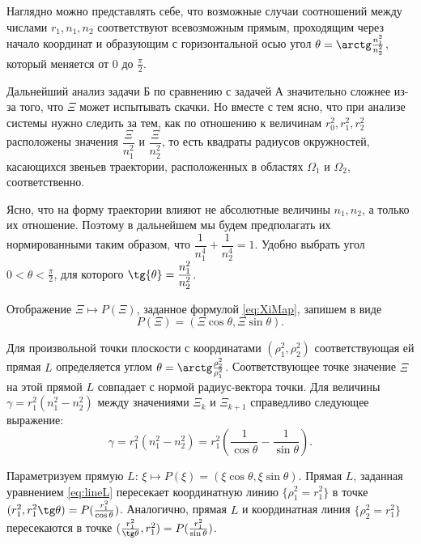Наглядно можно представлять себе, что возможные случаи соотношений между числами $r_1, n_1, n_2$ соответствуют всевозможным прямым, проходящим через начало координат и образующим   с горизонтальной осью угол $\theta = \arctg \frac{n_1^2}{n_2^2}$, который меняется от $0$ до $\frac{\pi}{2}$.

Дальнейший анализ задачи Б по сравнению с задачей А значительно сложнее из-за того, что $\Xi$ может испытывать скачки.
Но вместе с тем ясно, что при анализе системы нужно следить за тем, как по отношению к величинам $r_0^2, r_1^2, r_2^2$ расположены значения $\dfrac{\Xi}{n_1^2}$ и $\dfrac{\Xi}{n_2^2}$, то есть квадраты радиусов окружностей, касающихся звеньев траектории, расположенных в областях $\Omega_1$ и $\Omega_2$, соответственно.
\begin{remark}
Ясно, что на форму траектории влияют не абсолютные величины $n_1, n_2$, а только их отношение. Поэтому в дальнейшем мы будем предполагать их нормированными таким образом, что $\dfrac{1}{n_1^4} + \dfrac{1}{n_2^4} = 1$.
Удобно выбрать угол $0 < \theta < \frac{\pi}{2}$, для которого $\tg{\theta} = \dfrac{n_1^2}{n_2^2}$.
\end{remark}

Отображение $\Xi \mapsto P(\Xi)$, заданное формулой \eqref{eq:XiMap}, запишем в виде 
$$P(\Xi) = \left( \Xi \cos \theta, \Xi \sin \theta \right).$$

\begin{remark}
Для произвольной точки плоскости с координатами $(\rho_1^2, \rho_2^2)$ соответствующая ей прямая $L$ определяется углом $\theta = \arctg \frac{\rho_2^2}{\rho_1^2}$. Соответствующее точке значение $\Xi$ на этой прямой $L$ совпадает с нормой радиус-вектора точки.
Для величины $\gamma = r_1^2 (n_1^2 - n_2^2)$ между значениями $\Xi_k$ и $\Xi_{k+1}$  справедливо следующее выражение:
$$\gamma = r_1^2 (n_1^2 - n_2^2) = r_1^2 \left( \frac{1}{\cos \theta} -  \frac{1}{\sin \theta} \right).$$

\end{remark}

Параметризуем прямую $L$: $\xi \mapsto P(\xi) = (\xi \cos \theta, \xi \sin \theta)$.
Прямая $L$, заданная уравнением \eqref{eq:lineL} пересекает координатную линию $\{ \rho_1^2 = r_1^2 \}$ в точке $(r_1^2, r_1^2 \tg \theta) = P(\frac{r_1^2}{\cos \theta})$.
Аналогично, прямая $L$ и координатная линия $\{ \rho_2^2 = r_1^2 \}$ пересекаются в точке $(\frac{r_1^2}{\tg \theta}, r_1^2) = P(\frac{r_1^2}{\sin \theta})$. 

